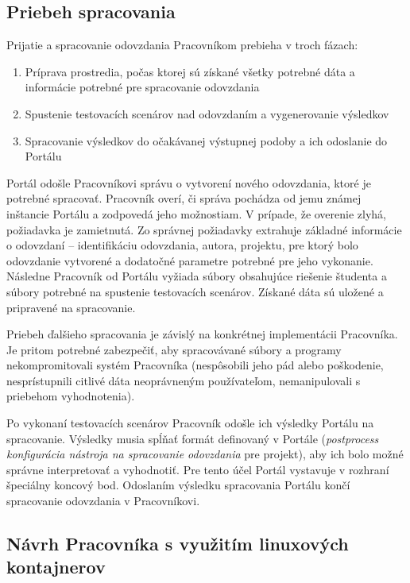 \documentclass[
  digital, %
  oneside, %
  table,   %
  lof,     %
  lot,   %
]{fithesis3}
\begin{document}
\subsection{Priebeh spracovania}

Prijatie a spracovanie odovzdania Pracovníkom prebieha v troch fázach:

\begin{enumerate}
    \item Príprava prostredia, počas ktorej sú získané všetky potrebné dáta a informácie potrebné pre spracovanie odovzdania
    \item Spustenie testovacích scenárov nad odovzdaním a vygenerovanie výsledkov
    \item Spracovanie výsledkov do očakávanej výstupnej podoby a ich odoslanie do Portálu
\end{enumerate}

Portál odošle Pracovníkovi správu o vytvorení nového odovzdania, ktoré je potrebné spracovať. Pracovník overí, či správa pochádza od jemu známej inštancie Portálu a zodpovedá jeho možnostiam.  V prípade, že overenie zlyhá, požiadavka je zamietnutá. Zo správnej požiadavky extrahuje základné informácie o odovzdaní -- identifikáciu odovzdania, autora, projektu, pre ktorý bolo odovzdanie vytvorené a dodatočné parametre potrebné pre jeho vykonanie. Následne Pracovník od Portálu vyžiada súbory obsahujúce riešenie študenta a súbory potrebné na spustenie testovacích scenárov. Získané dáta sú uložené a pripravené na spracovanie. 

Priebeh ďalšieho spracovania je závislý na konkrétnej implementácii Pracovníka. Je pritom potrebné zabezpečiť, aby spracovávané súbory a programy nekompromitovali systém Pracovníka (nespôsobili jeho pád alebo poškodenie, nesprístupnili citlivé dáta neoprávneným používateľom, nemanipulovali s priebehom vyhodnotenia). 

Po vykonaní testovacích scenárov Pracovník odošle ich výsledky Portálu na spracovanie. Výsledky musia spĺňať formát definovaný v Portále (\emph{postprocess konfigurácia nástroja na spracovanie odovzdania} pre projekt), aby ich bolo možné správne interpretovať a vyhodnotiť. Pre tento účel Portál vystavuje v rozhraní špeciálny koncový bod. Odoslaním výsledku spracovania Portálu končí spracovanie odovzdania v Pracovníkovi.

\subsection{Návrh Pracovníka s využitím linuxových kontajnerov}
\label{design-worker-lc}
\end{document}
